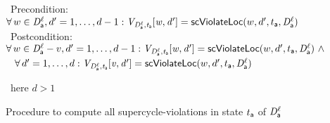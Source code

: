 \begin{figure}[ht]
\begin{tabbing}
\cmnt\ Precondition: $\forall\, w \in \mathit{D}_{\mathsf{a}}^{\ell}, d' = 1,\ldots,d-1: \mathit{V_{\mathit{D}_{\mathsf{a}}^{\ell},t_{\mathsf{a}}} [w,d']} = \mathsf{scViolateLoc}(w,d',t_{\mathsf{a}},\mathit{D}_{\mathsf{a}}^{\ell})$\\
\cmnt\ Postcondition: $\forall\, w \in \mathit{D}_{\mathsf{a}}^{\ell}-v, d' = 1,\ldots,d-1:  \mathit{V_{\mathit{D}_{\mathsf{a}}^{\ell},t_{\mathsf{a}}} [w,d']} = \mathsf{scViolateLoc}(w,d',t_{\mathsf{a}},\mathit{D}_{\mathsf{a}}^{\ell}) ~\land$ \\
\cmnt\ \hspace{6.5em} $\forall\, d' = 1,\ldots,d:  \mathit{V_{\mathit{D}_{\mathsf{a}}^{\ell},t_{\mathsf{a}}} [v,d']} = \mathsf{scViolateLoc}(w,d',t_{\mathsf{a}},\mathit{D}_{\mathsf{a}}^{\ell})$ \\

       \lit{\FI}

\cmnt\ here $d > 1$\\





\end{tabbing}
\vspace{-3ex}

\caption{Procedure to compute all supercycle-violations in state $t_{\mathsf{a}}$ of $\mathit{D}_{\mathsf{a}}^{\ell}$}
\label{fig:computeSCViolateLocDSK}
\label{fig:computeSCViolateLoc}
\end{figure}





















